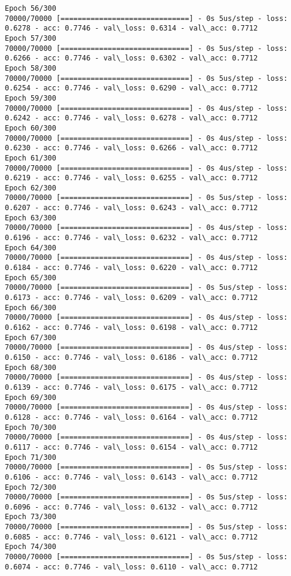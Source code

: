 \documentclass[11pt]{article}
\begin{document}
\begin{Verbatim}[commandchars=\\\{\}]
Epoch 56/300
70000/70000 [==============================] - 0s 5us/step - loss: 0.6278 - acc: 0.7746 - val\_loss: 0.6314 - val\_acc: 0.7712
Epoch 57/300
70000/70000 [==============================] - 0s 5us/step - loss: 0.6266 - acc: 0.7746 - val\_loss: 0.6302 - val\_acc: 0.7712
Epoch 58/300
70000/70000 [==============================] - 0s 5us/step - loss: 0.6254 - acc: 0.7746 - val\_loss: 0.6290 - val\_acc: 0.7712
Epoch 59/300
70000/70000 [==============================] - 0s 4us/step - loss: 0.6242 - acc: 0.7746 - val\_loss: 0.6278 - val\_acc: 0.7712
Epoch 60/300
70000/70000 [==============================] - 0s 4us/step - loss: 0.6230 - acc: 0.7746 - val\_loss: 0.6266 - val\_acc: 0.7712
Epoch 61/300
70000/70000 [==============================] - 0s 4us/step - loss: 0.6219 - acc: 0.7746 - val\_loss: 0.6255 - val\_acc: 0.7712
Epoch 62/300
70000/70000 [==============================] - 0s 5us/step - loss: 0.6207 - acc: 0.7746 - val\_loss: 0.6243 - val\_acc: 0.7712
Epoch 63/300
70000/70000 [==============================] - 0s 4us/step - loss: 0.6196 - acc: 0.7746 - val\_loss: 0.6232 - val\_acc: 0.7712
Epoch 64/300
70000/70000 [==============================] - 0s 4us/step - loss: 0.6184 - acc: 0.7746 - val\_loss: 0.6220 - val\_acc: 0.7712
Epoch 65/300
70000/70000 [==============================] - 0s 5us/step - loss: 0.6173 - acc: 0.7746 - val\_loss: 0.6209 - val\_acc: 0.7712
Epoch 66/300
70000/70000 [==============================] - 0s 4us/step - loss: 0.6162 - acc: 0.7746 - val\_loss: 0.6198 - val\_acc: 0.7712
Epoch 67/300
70000/70000 [==============================] - 0s 4us/step - loss: 0.6150 - acc: 0.7746 - val\_loss: 0.6186 - val\_acc: 0.7712
Epoch 68/300
70000/70000 [==============================] - 0s 4us/step - loss: 0.6139 - acc: 0.7746 - val\_loss: 0.6175 - val\_acc: 0.7712
Epoch 69/300
70000/70000 [==============================] - 0s 4us/step - loss: 0.6128 - acc: 0.7746 - val\_loss: 0.6164 - val\_acc: 0.7712
Epoch 70/300
70000/70000 [==============================] - 0s 4us/step - loss: 0.6117 - acc: 0.7746 - val\_loss: 0.6154 - val\_acc: 0.7712
Epoch 71/300
70000/70000 [==============================] - 0s 5us/step - loss: 0.6106 - acc: 0.7746 - val\_loss: 0.6143 - val\_acc: 0.7712
Epoch 72/300
70000/70000 [==============================] - 0s 5us/step - loss: 0.6096 - acc: 0.7746 - val\_loss: 0.6132 - val\_acc: 0.7712
Epoch 73/300
70000/70000 [==============================] - 0s 5us/step - loss: 0.6085 - acc: 0.7746 - val\_loss: 0.6121 - val\_acc: 0.7712
Epoch 74/300
70000/70000 [==============================] - 0s 5us/step - loss: 0.6074 - acc: 0.7746 - val\_loss: 0.6110 - val\_acc: 0.7712

\end{Verbatim}
\end{document}
